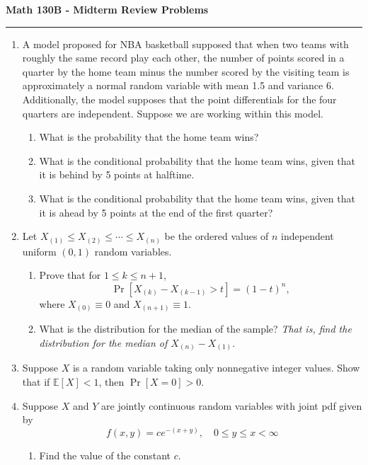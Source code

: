\documentclass[11pt,letterpaper]{article}
\newcommand{\E}{\mathbb{E}}
\begin{document}
\begin{center}
{\bf \Large Math 130B - Midterm Review Problems}
\vspace{0.2cm}
\hrule
\end{center}

\begin{enumerate}
	\item A model proposed for NBA basketball supposed that when two teams with roughly the same record play each other, the number of points scored in a quarter by the home team minus the number scored by the visiting team is approximately a normal random variable with mean 1.5 and variance 6.
	Additionally, the model supposes that the point differentials for the four quarters are independent.
	Suppose we are working within this model.
	\begin{enumerate}
		\item What is the probability that the home team wins?
		\vfill

		\item What is the conditional probability that the home team wins, given that it is behind by 5 points at halftime.
		\vfill

		\item What is the conditional probability that the home team wins, given that it is ahead by 5 points at the end of the first quarter?
	\end{enumerate}
	\vfill

	\item Let $X_{(1)} \leq X_{(2)} \leq \cdots \leq X_{(n)}$ be the ordered values of $n$ independent uniform $(0,1)$ random variables.
	\begin{enumerate}
		\item Prove that for $1\leq k \leq n+1$,
		\[
			\Pr[X_{(k)} - X_{(k-1)} > t] = (1-t)^n,
		\]
		where $X_{(0)} \equiv 0$ and $X_{(n+1)} \equiv 1$.
		\vfill

		\item What is the distribution for the median of the sample? \textit{That is, find the distribution for the median of $X_{(n)} - X_{(1)}$}.
	\end{enumerate}

	\vfill\null\pagebreak

	\item Suppose $X$ is a random variable taking only nonnegative integer values. Show that if $\E[X] < 1$, then $\Pr[X = 0] > 0$.

	\vfill

	\item Suppose $X$ and $Y$ are jointly continuous random variables with joint pdf given by
	\[
		f(x,y) = ce^{-(x+y)},\quad 0\leq y\leq x <\infty
	\]
	\begin{enumerate}
		\item Find the value of the constant $c$.
		\vfill


\end{enumerate}
\end{enumerate}
\end{document}
